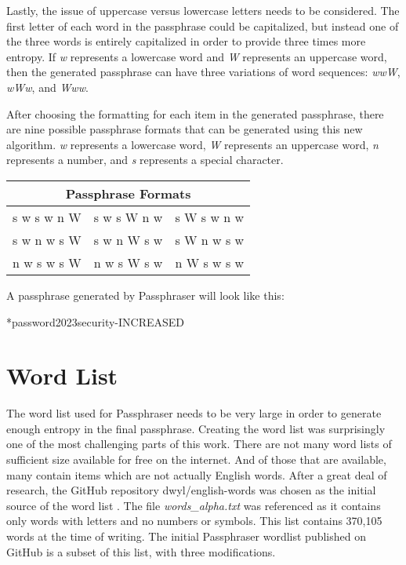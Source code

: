 \documentclass[
	a4paper, %
	10pt, %
	unnumberedsections, %
	twoside, %
]{LTJournalArticle}
\begin{document}
Lastly, the issue of uppercase versus lowercase letters needs to be considered. The first letter of each word in the passphrase could be capitalized, but instead one of the three words is entirely capitalized in order to provide three times more entropy. If \textit{w} represents a lowercase word and \textit{W} represents an uppercase word, then the generated passphrase can have three variations of word sequences: \textit{wwW}, \textit{wWw}, and \textit{Www}.

After choosing the formatting for each item in the generated passphrase, there are nine possible passphrase formats that can be generated using this new algorithm. \textit{w} represents a lowercase word, \textit{W} represents an uppercase word, \textit{n} represents a number, and \textit{s} represents a special character.

\begin{table}[h] %
	\centering
	\begin{tabular}{l|l|l}
		\multicolumn{3}{c}{Passphrase Formats} \\
		\midrule
		s w s w n W & s w s W n w & s W s w n w \\
		s w n w s W & s w n W s w & s W n w s w \\
		n w s w s W & n w s W s w & n W s w s w \\
		\bottomrule
	\end{tabular}
	\label{tab:passphraseformats}
\end{table}

A passphrase generated by Passphraser will look like this:

\centerline{*password2023security-INCREASED}


\section{Word List}
The word list used for Passphraser needs to be very large in order to generate enough entropy in the final passphrase. Creating the word list was surprisingly one of the most challenging parts of this work. There are not many word lists of sufficient size available for free on the internet. And of those that are available, many contain items which are not actually English words. After a great deal of research, the GitHub repository dwyl/english-words was chosen as the initial source of the word list \autocite{dwylwordlist}. The file \textit{words\_alpha.txt} was referenced as it contains only words with letters and no numbers or symbols. This list contains 370,105 words at the time of writing. The initial Passphraser wordlist published on GitHub \autocite{passphraserwordlist} is a subset of this list, with three modifications.
\end{document}
